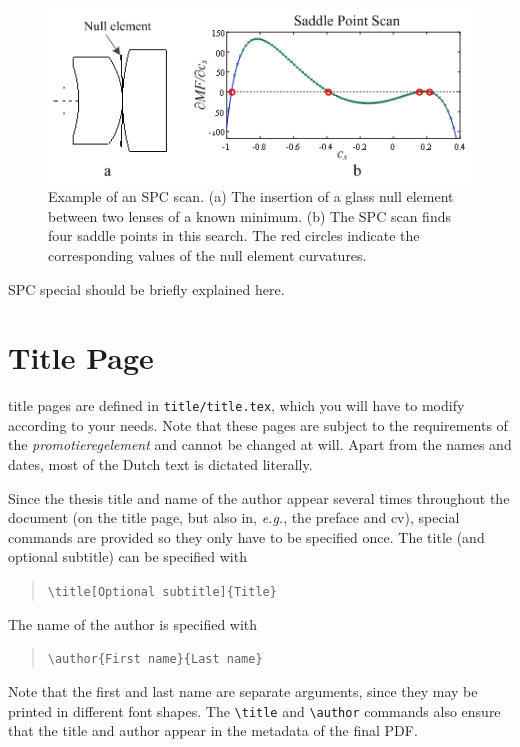 \begin{figure}[h!]
    \centering
    \includegraphics[scale=0.8]{SPCscan}
    \caption{Example of an SPC scan. (a) The insertion of a glass null element between two lenses of a known minimum. (b) The SPC scan finds four saddle points in this search. The red circles indicate the corresponding values of the null element curvatures.}
    \label{fig:SPCscan}
\end{figure}


SPC special should be briefly explained here. 

\section{Title Page}

 title pages are defined in \texttt{title/title.tex}, which you will have to modify according to your needs. Note that these pages are subject to the requirements of the \emph{promotieregelement} and cannot be changed at will. Apart from the names and dates, most of the Dutch text is dictated literally.

Since the thesis title and name of the author appear several times throughout the document (on the title page, but also in, \emph{e.g.}, the preface and cv), special commands are provided so they only have to be specified once. The title (and optional subtitle) can be specified with

\begin{quote}
\texttt{\textbackslash title[Optional subtitle]\{Title\}}
\end{quote}
The name of the author is specified with
\begin{quote}
\texttt{\textbackslash author\{First name\}\{Last name\}}
\end{quote}
Note that the first and last name are separate arguments, since they may be printed in different font shapes. The \texttt{\textbackslash title} and \texttt{\textbackslash author} commands also ensure that the title and author appear in the metadata of the final PDF.

